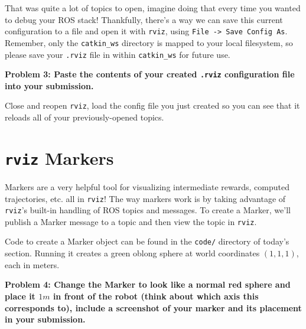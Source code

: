 \documentclass{article}
\begin{document}
That was quite a lot of topics to open, imagine doing that every time you wanted to debug your ROS stack! Thankfully, there's a way we can save this current configuration to a file and open it with \texttt{rviz}, using \texttt{File -> Save Config As}. Remember, only the \texttt{catkin\_ws} directory is mapped to your local filesystem, so please save your \texttt{.rviz} file in within \texttt{catkin\_ws} for future use.

{\bf Problem 3: Paste the contents of your created \texttt{.rviz} configuration file into your submission.}

Close and reopen \texttt{rviz}, load the config file you just created so you can see that it reloads all of your previously-opened topics.

\section{\texttt{rviz} Markers}

Markers are a very helpful tool for visualizing intermediate rewards, computed trajectories, etc. all in \texttt{rviz}! The way markers work is by taking advantage of \texttt{rviz}'s built-in handling of ROS topics and messages. To create a Marker, we'll publish a Marker message to a topic and then view the topic in \texttt{rviz}.

Code to create a Marker object can be found in the \texttt{code/} directory of today's section. Running it creates a green oblong sphere at world coordinates $(1, 1, 1)$, each in meters.

{\bf Problem 4: Change the Marker to look like a normal red sphere and place it $1m$ in front of the robot (think about which axis this corresponds to), include a screenshot of your marker and its placement in your submission.}
\end{document}
